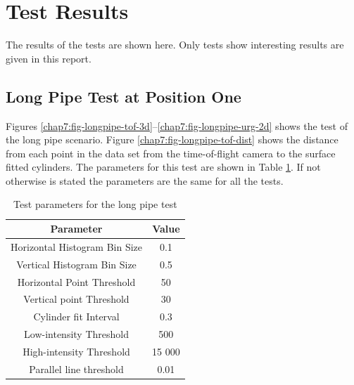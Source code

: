 \section{Test Results}
The results of the tests are shown here. Only tests show interesting results are given in
this report. 

\subsection{Long Pipe Test at Position One}
Figures \ref{chap7:fig-longpipe-tof-3d}--\ref{chap7:fig-longpipe-urg-2d} shows the test of
the long pipe scenario. Figure \ref{chap7:fig-longpipe-tof-dist} shows the distance from each
point in the data set from the time-of-flight camera to the surface fitted cylinders. The
parameters for this test are shown in Table \ref{chap7:tab-longpipe}. If not otherwise is
stated the parameters are the same for all the tests. 
\begin{table}[htbp]
    \centering
    \begin{tabular}{|c|c|}
        \hline
        Parameter   &   Value   \\
        \hline
        Horizontal Histogram Bin Size & 0.1 \\
        Vertical Histogram Bin Size & 0.5 \\
        Horizontal Point Threshold & 50 \\
        Vertical point Threshold & 30 \\
        \hline
        Cylinder fit Interval & 0.3 \\
        Low-intensity Threshold & 500 \\
        High-intensity Threshold & 15 000 \\
        \hline
        Parallel line threshold & 0.01 \\
        \hline
    \end{tabular}
    \caption{Test parameters for the long pipe test}
    \label{chap7:tab-longpipe}
\end{table}
